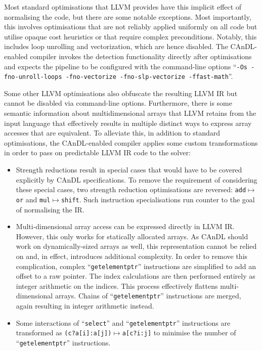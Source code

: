     Most standard optimisations that LLVM provides have this implicit
    effect of normalising the code, but there are some notable exceptions.
    Most importantly, this involves optimisations that are not reliably applied
    uniformly on all code but utilise opaque cost heuristics or that require
    complex preconditions.
    Notably, this includes loop unrolling and vectorization, which are hence
    disabled.
    The CAnDL-enabled compiler invokes the detection functionality
    directly after optimisations and expects the pipeline to be
    configured with the command-line options
    ``{\tt -Os -fno-unroll-loops -fno-vectorize -fno-slp-vectorize -ffast-math}''.

    Some other LLVM optimisations also obfuscate the resulting LLVM IR but cannot
    be disabled via command-line options.
    Furthermore, there is some semantic information about multidimensional arrays
    that LLVM retains from the input language that effectively results in
    multiple distinct ways to express array accesses that are equivalent.
    To alleviate this, in addition to standard optimisations, the CAnDL-enabled
    compiler applies some custom transformations in order to pass on predictable
    LLVM IR code to the solver:
    \begin{itemize}
        \item Strength reductions result in special cases that would have to be
              covered explicitly by CAnDL specifications.
              To remove the requirement of considering these special cases, two
              strength reduction optimisations are reversed:
              {\tt add}$\mapsto${\tt or} and {\tt mul}$\mapsto${\tt shift}.
              Such instruction specialisations run counter to the goal of
              normalising the IR.
        \item Multi-dimensional array access can be expressed directly in
              LLVM IR.
              However, this only works for statically allocated arrays.
              As CAnDL should work on dynamically-sized arrays as well, this
              representation cannot be relied on and, in effect, introduces
              additional complexity.
              In order to remove this complication, complex
              ``{\tt getelementptr}'' instructions are simplified to
              add an offset to a raw pointer.
              The index calculations are then performed entirely as integer
              arithmetic on the indices.
              This process effectively flattens multi-dimensional arrays.
              Chains of ``{\tt getelementptr}'' instructions are merged, again
              resulting in integer arithmetic instead.
        \item Some interactions of ``{\tt select}'' and
              ``{\tt getelementptr}'' instructions are transformed as
              {\tt (c?a[i]:a[j])}$\mapsto${\tt a[c?i:j]} to minimise the number
              of ``{\tt getelementptr}'' instructions.
    \end{itemize}
